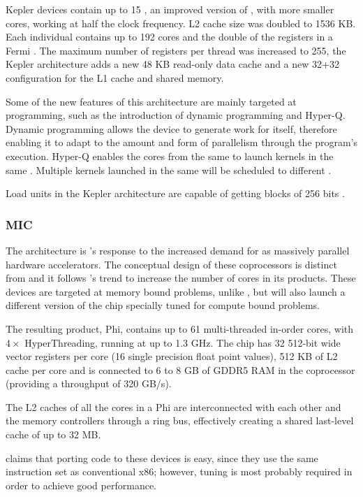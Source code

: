 Kepler devices contain up to 15 \smx, an improved version of \sm, with more smaller cores, working at half the clock frequency. L2 cache size was doubled to 1536 KB. Each individual \smx contains up to 192 cores and the double of the registers in a Fermi \sm. The maximum number of registers per thread was increased to 255, the Kepler architecture adds a new 48 KB read-only data cache and a new 32+32 configuration for the L1 cache and shared memory.

Some of the new features of this architecture are mainly targeted at programming, such as the introduction of dynamic programming and Hyper-Q. Dynamic programming allows the device to generate work for itself, therefore enabling it to adapt to the amount and form of parallelism through the program's execution. Hyper-Q enables the cores from the same \cpu to launch kernels in the same \gpu. Multiple kernels launched in the same \gpu will be scheduled to different \smx.

Load units in the Kepler architecture are capable of getting blocks of 256 bits \cite{NVIDIA:KEPLER}.


\subsubsection{\acf{MIC}}
The \mic architecture \cite{Intel:XeonPhi:QuickStartGuide} is \intel's response to the increased demand for \gpgpus as massively parallel hardware accelerators. The conceptual design of these coprocessors is distinct from \gpgpus and it follows \intel's trend to increase the number of cores in its products. These devices are targeted at memory bound problems, unlike \gpus, but \intel will also launch a different version of the chip specially tuned for compute bound problems.

The resulting product, \intel\xeon Phi, contains up to 61 multi-threaded in-order cores, with $4\times$ HyperThreading, running at up to 1.3 GHz. The chip has 32 512-bit wide vector registers per core (16 single precision float point values), 512 KB of L2 cache per core and is connected to 6 to 8 GB of GDDR5 RAM in the coprocessor (providing a throughput of 320 GB/s).

The L2 caches of all the cores in a \xeon Phi are interconnected with each other and the memory controllers through a ring bus, effectively creating a shared last-level cache of up to 32 MB.

\intel claims that porting \cpu code to these devices is easy, since they use the same instruction set as conventional x86; however, tuning is most probably required in order to achieve good performance.




